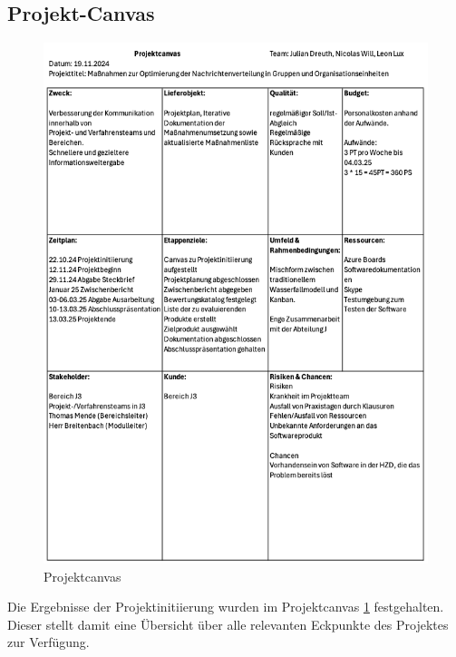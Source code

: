 \documentclass[ThesisDJ.tex]{subfiles}
\begin{document}
	\subsection{Projekt-Canvas}
  \begin{figure}
    \includegraphics[scale=0.5]{Projektcanvas.png}
    \centering
    \caption{Projektcanvas}
    \label{fig:canvas}
  \end{figure}
  Die Ergebnisse der Projektinitiierung wurden im Projektcanvas \ref{fig:canvas} festgehalten. Dieser stellt damit eine Übersicht über alle relevanten
  Eckpunkte des Projektes zur Verfügung.
\end{document}
